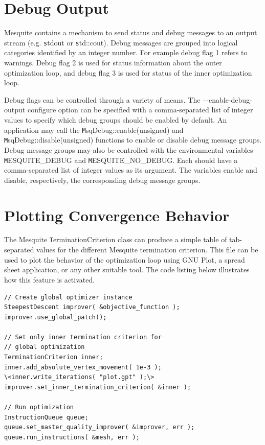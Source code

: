 \section{Debug Output}

Mesquite contains a mechanism to send status and debug messages to an output stream (e.g. {\texttt stdout} or {\texttt std::cout}).  Debug messages are grouped into logical categories identified by an integer number.  For example debug flag 1 refers to warnings.  Debug flag 2 is used for status information about the outer optimization loop, and debug flag 3 is used for status of the inner optimization loop. 

Debug flags can be controlled through a variety of means.  The {\texttt --enable-debug-output} configure option can be specified with a comma-separated list of integer values to specify which debug groups should be enabled by default.  An application may call the {\texttt MsqDebug::enable(unsigned)} and {\texttt MsqDebug::disable(unsigned)} functions to enable or disable debug message groups.  Debug message groups may also be controlled with the environmental variables {\texttt MESQUITE\_DEBUG} and {\texttt MESQUITE\_NO\_DEBUG}.  Each should have a comma-separated list of integer values as its argument.  The variables enable and disable, respectively, the corresponding debug message groups.

\section{Plotting Convergence Behavior \label{sec:optplot}}

The Mesquite {\texttt TerminationCriterion} class can produce a simple table of tab-separated values for the different Mesquite termination criterion.  This file can be used to plot the behavior of the optimization loop using GNU Plot, a spread sheet application, or any other suitable tool.  The code listing below illustrates how this feature is activated.

\begin{lstlisting}[frame=single]
// Create global optimizer instance
SteepestDescent improver( &objective_function );
improver.use_global_patch();

// Set only inner termination criterion for 
// global optimization
TerminationCriterion inner;
inner.add_absolute_vertex_movement( 1e-3 );
\<inner.write_iterations( "plot.gpt" );\>
improver.set_inner_termination_criterion( &inner );

// Run optimization
InstructionQueue queue;
queue.set_master_quality_improver( &improver, err );
queue.run_instructions( &mesh, err );
\end{lstlisting}

